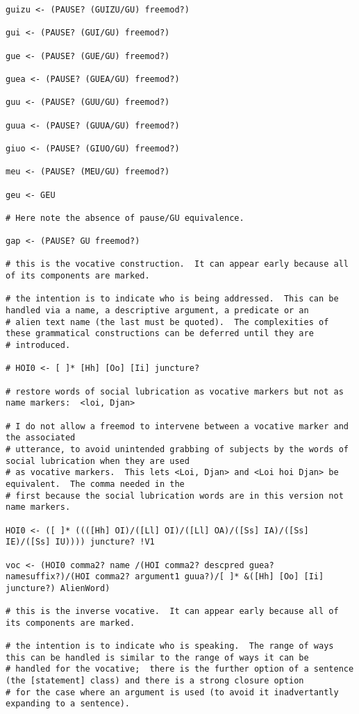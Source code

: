 \documentclass[12pt]{book}
\begin{document}
{\begin{verbatim}
guizu <- (PAUSE? (GUIZU/GU) freemod?)

gui <- (PAUSE? (GUI/GU) freemod?)

gue <- (PAUSE? (GUE/GU) freemod?)

guea <- (PAUSE? (GUEA/GU) freemod?)

guu <- (PAUSE? (GUU/GU) freemod?)

guua <- (PAUSE? (GUUA/GU) freemod?)

giuo <- (PAUSE? (GIUO/GU) freemod?)

meu <- (PAUSE? (MEU/GU) freemod?)

geu <- GEU

# Here note the absence of pause/GU equivalence.

gap <- (PAUSE? GU freemod?)

# this is the vocative construction.  It can appear early because all of its components are marked.

# the intention is to indicate who is being addressed.  This can be handled via a name, a descriptive argument, a predicate or an
# alien text name (the last must be quoted).  The complexities of these grammatical constructions can be deferred until they are
# introduced.

# HOI0 <- [ ]* [Hh] [Oo] [Ii] juncture?  

# restore words of social lubrication as vocative markers but not as name markers:  <loi, Djan>  

# I do not allow a freemod to intervene between a vocative marker and the associated
# utterance, to avoid unintended grabbing of subjects by the words of social lubrication when they are used
# as vocative markers.  This lets <Loi, Djan> and <Loi hoi Djan> be equivalent.  The comma needed in the
# first because the social lubrication words are in this version not name markers.
       
HOI0 <- ([ ]* ((([Hh] OI)/([Ll] OI)/([Ll] OA)/([Ss] IA)/([Ss] IE)/([Ss] IU)))) juncture? !V1

voc <- (HOI0 comma2? name /(HOI comma2? descpred guea? namesuffix?)/(HOI comma2? argument1 guua?)/[ ]* &([Hh] [Oo] [Ii] juncture?) AlienWord)

# this is the inverse vocative.  It can appear early because all of its components are marked.

# the intention is to indicate who is speaking.  The range of ways this can be handled is similar to the range of ways it can be
# handled for the vocative;  there is the further option of a sentence (the [statement] class) and there is a strong closure option
# for the case where an argument is used (to avoid it inadvertantly expanding to a sentence).


\end{verbatim}}
\end{document}
